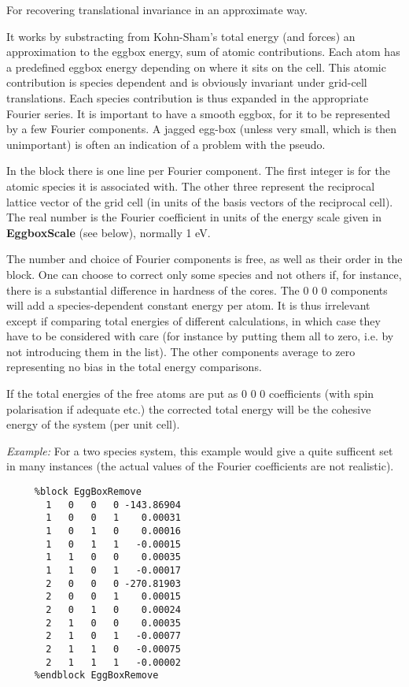 \documentclass[11pt]{article}
\begin{document}
\begin{description}
For recovering translational invariance in an approximate way.

It works by substracting from Kohn-Sham's total energy (and forces) an
approximation to the eggbox energy, sum of atomic contributions.
Each atom has a predefined eggbox energy depending on where it sits on
the cell. This atomic contribution is species dependent and is
obviously invariant under grid-cell translations. Each species
contribution is thus expanded in the appropriate Fourier series.
It is important to have a smooth eggbox, for it to
be represented by a few Fourier components. A jagged egg-box (unless
very small, which is then unimportant) is often an
indication of a problem with the pseudo.

In the block there is one line per Fourier component. The first integer
is for the atomic species it is associated with. The other three
represent the reciprocal lattice vector of the grid cell (in units
of the basis vectors of the reciprocal cell). The real number is
the Fourier coefficient in units of the energy scale given in
{\bf EggboxScale} (see below), normally 1 eV.

The number and choice of Fourier components is free, as well as their
order in the block. One can choose to correct only some species and not
others if, for instance, there is a substantial difference in hardness
of the cores. The 0 0 0 components will add a species-dependent
constant energy per atom. It is thus irrelevant except if comparing
total energies of different calculations, in which case they
have to be considered with care (for instance by putting them all to zero,
i.e. by not introducing them in the list).
The other components average to zero representing no bias in the
total energy comparisons.

If the total
energies of the free atoms are put as 0 0 0 coefficients (with
spin polarisation if adequate etc.) the corrected total energy
will be the cohesive energy of the system (per unit cell).

{\it Example:} For a two species system, this example would give a quite
sufficent set in many instances (the actual values of the Fourier
coefficients are not realistic).

\begin{verbatim}
     %block EggBoxRemove
       1   0   0   0 -143.86904
       1   0   0   1    0.00031
       1   0   1   0    0.00016
       1   0   1   1   -0.00015
       1   1   0   0    0.00035
       1   1   0   1   -0.00017
       2   0   0   0 -270.81903
       2   0   0   1    0.00015
       2   0   1   0    0.00024
       2   1   0   0    0.00035
       2   1   0   1   -0.00077
       2   1   1   0   -0.00075
       2   1   1   1   -0.00002
     %endblock EggBoxRemove
\end{verbatim}


\end{description}
\end{document}
